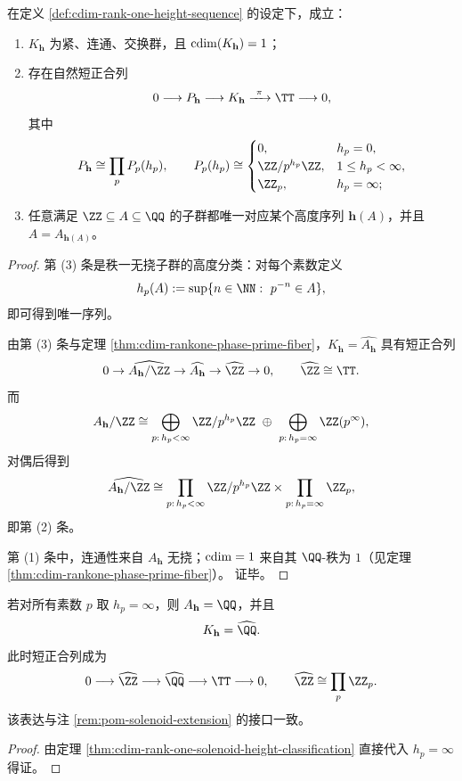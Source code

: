 \begin{theorem}\label{thm:cdim-rank-one-solenoid-height-classification}
在定义 \ref{def:cdim-rank-one-height-sequence} 的设定下，成立：
\begin{enumerate}
  \item \(K_{\mathbf h}\) 为紧、连通、交换群，且 \(\operatorname{cdim}(K_{\mathbf h})=1\)；
  \item 存在自然短正合列
  \[
  0\longrightarrow P_{\mathbf h}\longrightarrow K_{\mathbf h}\xrightarrow{\ \pi\ }\TT\longrightarrow 0,
  \]
  其中
  \[
  P_{\mathbf h}\cong \prod_{p} P_p(h_p),\qquad
  P_p(h_p)\cong
  \begin{cases}
  0,& h_p=0,\\
  \ZZ/p^{h_p}\ZZ,& 1\le h_p<\infty,\\
  \ZZ_p,& h_p=\infty;
  \end{cases}
  \]
  \item 任意满足 \(\ZZ\subseteq A\subseteq\QQ\) 的子群都唯一对应某个高度序列 \(\mathbf h(A)\)，并且 \(A=A_{\mathbf h(A)}\)。
\end{enumerate}
\end{theorem}
\begin{proof}
第 (3) 条是秩一无挠子群的高度分类：对每个素数定义
\[
h_p(A):=\sup\{n\in\NN:\ p^{-n}\in A\},
\]
即可得到唯一序列。
\par
由第 (3) 条与定理 \ref{thm:cdim-rankone-phase-prime-fiber}，\(K_{\mathbf h}=\widehat{A_{\mathbf h}}\) 具有短正合列
\[
0\to \widehat{A_{\mathbf h}/\ZZ}\to \widehat{A_{\mathbf h}}\to \widehat{\ZZ}\to 0,
\qquad
\widehat{\ZZ}\cong\TT.
\]
而
\[
A_{\mathbf h}/\ZZ
\cong
\bigoplus_{p:\,h_p<\infty}\ZZ/p^{h_p}\ZZ
\ \oplus\
\bigoplus_{p:\,h_p=\infty}\ZZ(p^\infty),
\]
对偶后得到
\[
\widehat{A_{\mathbf h}/\ZZ}
\cong
\prod_{p:\,h_p<\infty}\ZZ/p^{h_p}\ZZ
\times
\prod_{p:\,h_p=\infty}\ZZ_p,
\]
即第 (2) 条。
\par
第 (1) 条中，连通性来自 \(A_{\mathbf h}\) 无挠；\(\operatorname{cdim}=1\) 来自其 \(\QQ\)-秩为 \(1\)（见定理 \ref{thm:cdim-rankone-phase-prime-fiber}）。
证毕。
\end{proof}

\begin{corollary}\label{cor:cdim-universal-solenoid-full-prime-kernel}
若对所有素数 \(p\) 取 \(h_p=\infty\)，则 \(A_{\mathbf h}=\QQ\)，并且
\[
K_{\mathbf h}=\widehat{\QQ}.
\]
此时短正合列成为
\[
0\longrightarrow \widehat{\ZZ}
\longrightarrow \widehat{\QQ}
\longrightarrow \TT
\longrightarrow 0,
\qquad
\widehat{\ZZ}\cong \prod_{p}\ZZ_p.
\]
该表达与注 \ref{rem:pom-solenoid-extension} 的接口一致。
\end{corollary}
\begin{proof}
由定理 \ref{thm:cdim-rank-one-solenoid-height-classification} 直接代入 \(h_p=\infty\) 得证。
\end{proof}

